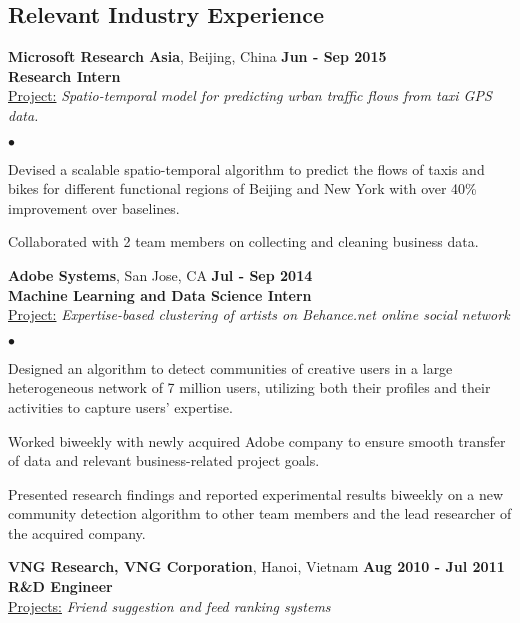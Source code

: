 \documentclass[margin,line]{res}
\newenvironment{list2}{
  \begin{list}{$\bullet$}{%
      \setlength{\itemsep}{0in}
      \setlength{\parsep}{0in} \setlength{\parskip}{0in}
      \setlength{\topsep}{0in} \setlength{\partopsep}{0in} 
      \setlength{\leftmargin}{0.2in}}}{\end{list}}
\begin{document}
\begin{resume}
\section{\sc Relevant Industry Experience}
{\bf Microsoft Research Asia}, Beijing, China  \hfill {\bf Jun - Sep 2015}
\\{\bf Research Intern}
\\\underline{Project:} {\em Spatio-temporal model for predicting urban traffic flows from taxi GPS data.}
\begin{list2}
\item Devised a scalable spatio-temporal algorithm to predict the flows of taxis and bikes for different functional regions of Beijing and New York with over 40\% improvement over baselines.
\item Collaborated with 2 team members on collecting and cleaning business data.
\end{list2}
\vspace*{-0.05in}
{\bf Adobe Systems}, San Jose, CA  \hfill {\bf Jul - Sep 2014}
\\{\bf Machine Learning and Data Science Intern}
\\\underline{Project:} {\em Expertise-based clustering of artists on Behance.net online social network}
\begin{list2}
\item Designed an algorithm to detect communities of creative users in a large heterogeneous network of 7 million users, utilizing both their profiles and their activities to capture users' expertise.
\item Worked biweekly with newly acquired Adobe company to ensure smooth transfer of data and relevant business-related project goals.
\item Presented research findings and reported experimental results biweekly on a new community detection algorithm to other team members and the lead researcher of the acquired company.
\end{list2}
\vspace*{-0.05in}
{\bf VNG Research, VNG Corporation}, Hanoi, Vietnam  \hfill {\bf Aug 2010 - Jul 2011}
\\{\bf R\&D Engineer}
\\\underline{Projects:} {\em Friend suggestion and feed ranking systems}

\end{resume}
\end{document}
